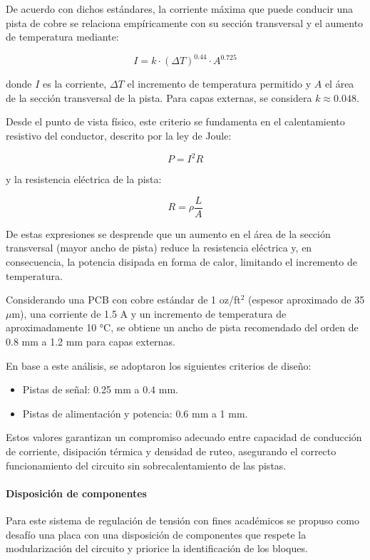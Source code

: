 \documentclass[]{article}
\begin{document}
	De acuerdo con dichos estándares, la corriente máxima que puede conducir una pista de cobre se relaciona empíricamente con su sección transversal y el aumento de temperatura mediante:
	
	\[
	I = k \cdot (\Delta T)^{0.44} \cdot A^{0.725}
	\]
	
	donde \( I \) es la corriente, \( \Delta T \) el incremento de temperatura permitido y \( A \) el área de la sección transversal de la pista. Para capas externas, se considera \( k \approx 0.048 \).
	
	Desde el punto de vista físico, este criterio se fundamenta en el calentamiento resistivo del conductor, descrito por la ley de Joule:
	
	\[
	P = I^2 R
	\]
	
	y la resistencia eléctrica de la pista:
	
	\[
	R = \rho \frac{L}{A}
	\]
	
	De estas expresiones se desprende que un aumento en el área de la sección transversal (mayor ancho de pista) reduce la resistencia eléctrica y, en consecuencia, la potencia disipada en forma de calor, limitando el incremento de temperatura.
	
	Considerando una PCB con cobre estándar de 1 oz/ft\(^2\) (espesor aproximado de 35 $\mu$m), una corriente de 1.5 A y un incremento de temperatura de aproximadamente 10 °C, se obtiene un ancho de pista recomendado del orden de 0.8 mm a 1.2 mm para capas externas.
	
	En base a este análisis, se adoptaron los siguientes criterios de diseño:
	
	\begin{itemize}
		\item Pistas de señal: 0.25 mm a 0.4 mm.
		\item Pistas de alimentación y potencia: 0.6 mm a 1 mm.
	\end{itemize}
	
	Estos valores garantizan un compromiso adecuado entre capacidad de conducción de corriente, disipación térmica y densidad de ruteo, asegurando el correcto funcionamiento del circuito sin sobrecalentamiento de las pistas.
	
	
	
	\paragraph{Disposición de componentes}
	Para este sistema de regulación de tensión con fines académicos se propuso como desafío una placa con una disposición de componentes que respete la modularización del circuito y priorice la identificación de los bloques.
	
\end{document}
